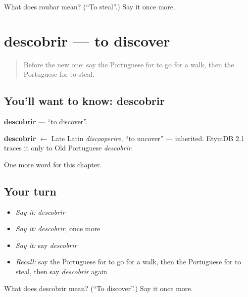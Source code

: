 \begin{tcolorbox}[breakable,colback=teal!4,colframe=teal!35!black,title={Before you move on}]
What does roubar mean? (\textquotedblleft{}To steal\textquotedblright{}.) Say it once more.
\end{tcolorbox}
\section[descobrir]{descobrir — to discover}

\label{lesson:PT-C206-descobrir}



\begin{quote}
Before the new one: say the Portuguese for to go for a walk, then the Portuguese for to steal.
\end{quote}

\subsection*{You'll want to know: descobrir}
\textbf{descobrir} — \textquotedblleft{}to discover\textquotedblright{}.

\begin{cousinweb}
\textbf{descobrir} $\leftarrow$ Late Latin \emph{discooperire}, \textquotedblleft{}to uncover\textquotedblright{} — inherited. EtymDB 2.1 traces it only to Old Portuguese \emph{descobrir}.
\end{cousinweb}

\begin{grammarlens}[title={What you've built}]
One more word for this chapter.
\end{grammarlens}

\subsection*{Your turn}
\begin{itemize}
\raggedright
  \item \emph{Say it:} \emph{descobrir}
  \item \emph{Say it:} \emph{descobrir}, once more
  \item \emph{Say it:} say \emph{descobrir}
  \item \emph{Recall:} say the Portuguese for to go for a walk, then the Portuguese for to steal, then say \emph{descobrir} again
\end{itemize}

\begin{tcolorbox}[breakable,colback=teal!4,colframe=teal!35!black,title={Before you move on}]
What does descobrir mean? (\textquotedblleft{}To discover\textquotedblright{}.) Say it once more.
\end{tcolorbox}
